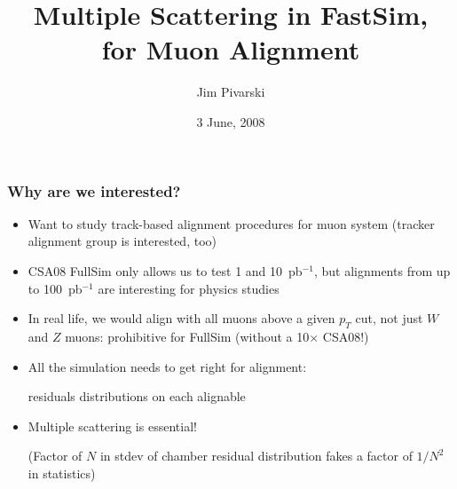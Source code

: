 \documentclass[compress]{beamer}
\title{Multiple Scattering in FastSim, \\ for Muon Alignment}
\author{Jim Pivarski}
\institute{Texas A\&M University}
\date{ 3 June, 2008}
\begin{document}
\frame{\titlepage}


\begin{frame}
\frametitle{Why are we interested?}
\begin{itemize}\setlength{\itemsep}{0.3 cm}
\item Want to study track-based alignment procedures for muon system (tracker alignment group is interested, too)
\item CSA08 FullSim only allows us to test 1 and 10~pb$^{-1}$, but alignments from up to 100~pb$^{-1}$ are interesting for physics studies
\item In real life, we would align with all muons above a given $p_T$ cut, not just $W$ and $Z$ muons: prohibitive for FullSim (without a 10$\times$ CSA08!)
\item All the simulation needs to get right for alignment: 

residuals distributions on each alignable
\item Multiple scattering is essential!

(Factor of $N$ in stdev of chamber residual distribution fakes a factor of $1/N^2$ in statistics)
\end{itemize}
\end{frame}
\end{document}
